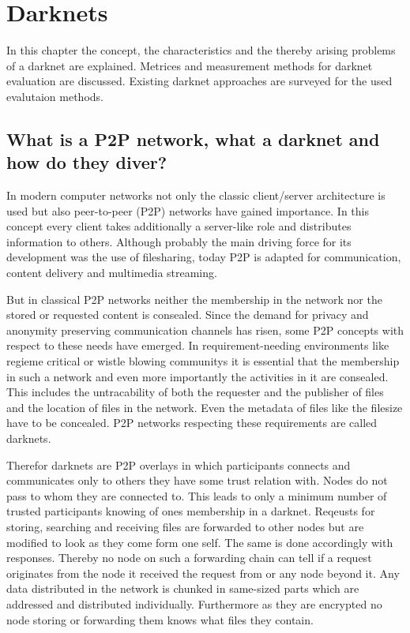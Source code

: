 \chapter{Darknets}

In this chapter the concept, the characteristics and the thereby arising problems of a darknet are explained. Metrices and measurement methods for darknet evaluation are discussed. Existing darknet approaches are surveyed for the used evalutaion methods. 

\section{What is a P2P network, what a darknet and how do they diver?}

In modern computer networks not only the classic client/server architecture is used but also peer-to-peer (P2P) networks have gained importance. In this concept every client takes additionally a server-like role and distributes information to others. Although probably the main driving force for its development was the use of filesharing, today P2P is adapted for communication, content delivery and multimedia streaming.

But in classical P2P networks neither the membership in the network nor the stored or requested content is consealed. Since the demand for privacy and anonymity preserving communication channels has risen, some P2P concepts with respect to these needs have emerged. In requirement-needing environments like regieme critical or wistle blowing communitys it is essential that the membership in such a network and even more importantly the activities in it are consealed. This includes the untracability of both the requester and the publisher of files and the location of files in the network. Even the metadata of files like the filesize have to be concealed. P2P networks respecting these requirements are called darknets.

Therefor darknets are P2P overlays in which participants connects and communicates only to others they have some trust relation with. Nodes do not pass to whom they are connected to. This leads to only a minimum number of trusted participants knowing of ones membership in a darknet. Reqeusts for storing, searching and receiving files are forwarded to other nodes but are modified to look as they come form one self. The same is done accordingly with responses. Thereby no node on such a forwarding chain can tell if a request originates from the node it received the request from or any node beyond it. Any data distributed in the network is chunked in same-sized parts which are addressed and distributed individually. Furthermore as they are encrypted no node storing or forwarding them knows what files they contain.



